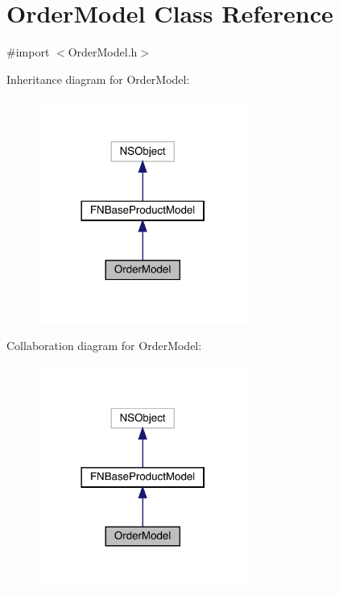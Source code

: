 \hypertarget{interface_order_model}{}\section{Order\+Model Class Reference}
\label{interface_order_model}


{\ttfamily \#import $<$Order\+Model.\+h$>$}



Inheritance diagram for Order\+Model\+:\nopagebreak
\begin{figure}[H]
\begin{center}
\leavevmode
\includegraphics[width=194pt]{interface_order_model__inherit__graph}
\end{center}
\end{figure}


Collaboration diagram for Order\+Model\+:\nopagebreak
\begin{figure}[H]
\begin{center}
\leavevmode
\includegraphics[width=194pt]{interface_order_model__coll__graph}
\end{center}
\end{figure}
